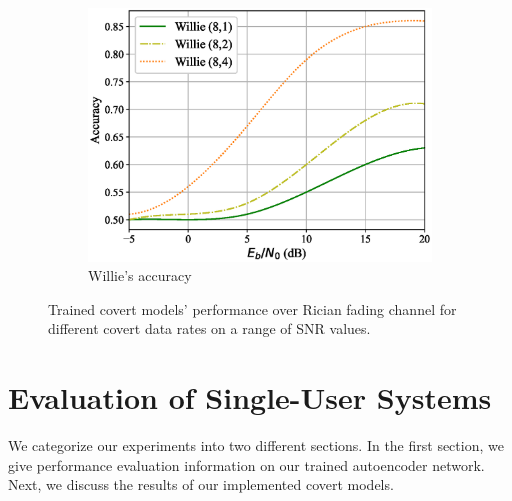 \begin{figure}
\begin{subfigure}{0.3\textwidth}
		\includegraphics[width=\linewidth]{figs/willie_accuracy_rician}
		\caption{Willie's accuracy}
		\label{fig:rician_resutls_willie}
	\end{subfigure}
	\caption{Trained covert models' performance over Rician fading channel for different covert data rates on a range of SNR values.}
	\label{fig:rician_resutls}
\end{figure}

\section{Evaluation of Single-User Systems}
\label{s:eval}
We categorize our experiments into two different sections. In the first section, we give performance evaluation information on our trained autoencoder network. Next, we discuss the results of our implemented covert models.


